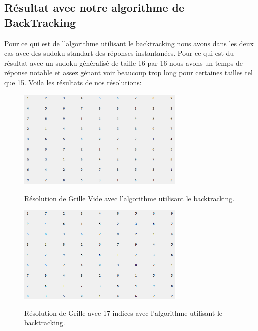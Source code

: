 \subsection{Résultat avec notre algorithme de BackTracking}
Pour ce qui est de l'algorithme utilisant le backtracking nous avons dans les deux cas avec des sudoku standart des réponses instantanées. Pour ce qui est du résultat avec un sudoku généralisé de taille 16 par 16 nous avons un temps de réponse notable et assez génant voir beaucoup trop long pour certaines tailles tel que 15.\newline
Voila les résultats de nos résolutions:

\begin{figure}[h]
  \begin{center}
\includegraphics[width=8cm]{./images/Res_Back_Vide.png}\label{Test_Back}
\caption{Résolution de Grille Vide avec l'algorithme utilisant le backtracking.}
\end{center}
\end{figure}


\begin{figure}[h]
  \begin{center}
\includegraphics[width=8cm]{./images/Res_Back_17.png}\label{Test_Back_17}
\caption{Résolution de Grille avec 17 indices avec l'algorithme utilisant le backtracking.}
\end{center}
\end{figure}


